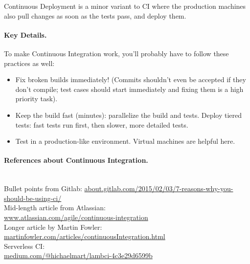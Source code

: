 \documentclass[11pt]{article}
\begin{document}
Continuous Deployment is a minor variant to CI where the production machines also pull changes
as soon as the tests pass, and deploy them.

\paragraph{Key Details.} To make Continuous Integration work, you'll probably have to follow these practices as well:

    \begin{itemize}[noitemsep]
    \item Fix broken builds immediately! (Commits shouldn't even be accepted if they don't compile; test cases should start immediately and fixing them is a high priority task).
    \item Keep the build fast (minutes): parallelize the build and tests. Deploy tiered tests: fast tests run first, then slower, more detailed tests.
    \item Test in a production-like environment. Virtual machines are helpful here.
    \end{itemize}


\paragraph{References about Continuous Integration.}~\\
    Bullet points from Gitlab: 
    \url{about.gitlab.com/2015/02/03/7-reasons-why-you-should-be-using-ci/}\\[1em]
    Mid-length article from Atlassian: \\
\url{www.atlassian.com/agile/continuous-integration}\\[1em]
    Longer article by Martin Fowler: \\
    \url{martinfowler.com/articles/continuousIntegration.html}\\[2em]
    Serverless CI: \\
    \url{medium.com/@hichaelmart/lambci-4c3e29d6599b}
\end{document}
